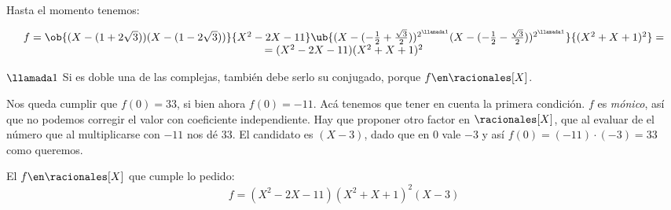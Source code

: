Hasta el momento tenemos:\par
$$
  \begin{array}{c}
    f =
    \ob{(X - (1+2\sqrt{3})) (X - (1-2\sqrt{3}))}{X^2 - 2X - 11}
    \ub{(X - (-\frac{1}{2} + \frac{\sqrt{3}}{2}))^{2^{\llamada1}}
    (X - (-\frac{1}{2} - \frac{\sqrt{3}}{2}))^{2^{\llamada1}}}{(X^2 + X + 1)^2} = \\
    =(X^2 - 2X - 11)(X^2 + X + 1)^2
  \end{array}
$$

$\llamada1$ Si es doble una de las complejas, también debe serlo su conjugado, porque
$f\en \racionales[X]$.\bigskip

Nos queda cumplir que $f(0) = 33$, si bien ahora $f(0) = -11$. Acá tenemos que tener en cuenta
la primera condición. $f$ es \textit{mónico}, así que no podemos corregir el valor con coeficiente independiente.
Hay que proponer otro factor en $\racionales[X]$, que al evaluar de el número que al multiplicarse con $-11$ nos dé
33. El candidato es $(X-3)$, dado que en 0 vale $-3$ y así $f(0) = (-11) \cdot (-3) = 33$ como queremos.\par

El $f \en\racionales[X]$ que cumple lo pedido:
$$
  \boxed{f = (X^2 - 2X - 11)(X^2 + X + 1)^2(X-3)}
$$



